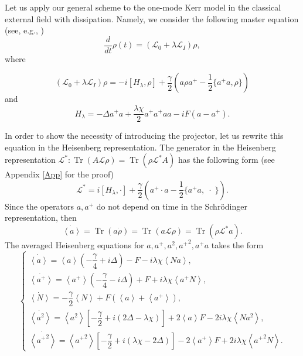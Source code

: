\documentclass[12pt]{article}
\theoremstyle{definition}
\newcommand\Tr{\operatorname{Tr}}
\newcommand\bra{\left<}
\newcommand\ket{\right>}
\newcommand{\braket}[1]{\bra#1\ket}
\def\DE {\Delta}
\def\ga {\gamma}
\def\la {\lambda}
\begin{document}
	Let us apply our general scheme to the one-mode Kerr model in the classical external field with dissipation. Namely, we consider the following master equation  (see, e.g., \cite{asjad2023joint})
	\begin{equation}
		\label{eq:EvEq}
		\dfrac{d}{dt}\rho(t) = (\mathcal{L}_0 + \lambda\mathcal{L}_I)\rho,
	\end{equation}
	where
	
	\begin{equation}
		\label{eq:FormOfL}
		(\mathcal{L}_0 + \lambda\mathcal{L}_I)\rho = -i[H_{\lambda},\rho] + \dfrac{\ga}{2}(a\rho a^+ - \dfrac12\{a^+a,\rho\})
	\end{equation}
	and
	\begin{equation}
		\label{eq:FormOfH}
		H_{\la} = -\DE a^+a + \dfrac{\la\chi}{2}a^+a^+aa - iF(a - a^+).
	\end{equation}
	
	In order to show the necessity of introducing the projector, let us rewrite this equation in the Heisenberg representation.	The generator in the Heisenberg representation $\mathcal{L}^*: \Tr(A\mathcal{L}\rho) = \Tr(\rho\mathcal{L}^*A)$ has the following form (see Appendix \ref{App} for the proof)
	\begin{equation}
		\label{eq:Lst}
		\mathcal{L}^* = i[H_{\la},\cdot]  + \dfrac{\ga}{2}(a^+\cdot a - \dfrac{1}{2}\{a^+a, \; \cdot \;\}).
	\end{equation}
	Since the operators $a, a^+$ do not depend on time in the Schrödinger representation, then
	\begin{equation}
		\label{eq:DinOfAv}
		\dot{\braket{a}} = \Tr(a\dot{\rho}) = \Tr(a\mathcal{L}\rho) = \Tr(\rho\mathcal{L}^*a).
	\end{equation}
	The averaged Heisenberg equations  for $a, a^+, a^2, {a^+}^2, a^+a$ takes the form
	\begin{equation}
		\label{eq:FinDinOfAv}
		\left\{\begin{array}{llll}
			\dot{\braket{a}} = \braket{a}(-\dfrac{\ga}{4} + i\DE) - F - i\la\chi\braket{Na},\\
			\dot{\braket{a^+}} = \braket{a^+}(-\dfrac{\ga}{4} - i\DE) + F + i\la\chi\braket{a^+N},\\
			\dot{\braket{N}} = -\dfrac{\ga}{2}\braket{N} + F(\braket{a} + \braket{a^+}),\\
			\dot{\braket{a^2}} = \braket{a^2}[-\dfrac{\ga}{2} + i(2\DE - \la\chi)] + 2\braket{a}F - 2i\la\chi\braket{Na^2},\\
			\dot{\braket{{a^+}^2}} = \braket{{a^+}^2}[-\dfrac{\ga}{2} + i(\la\chi - 2\DE)] - 2\braket{a^+}F + 2i\la\chi\braket{{a^+}^2N}.
		\end{array}
		\right.
	\end{equation}
	
\end{document}
